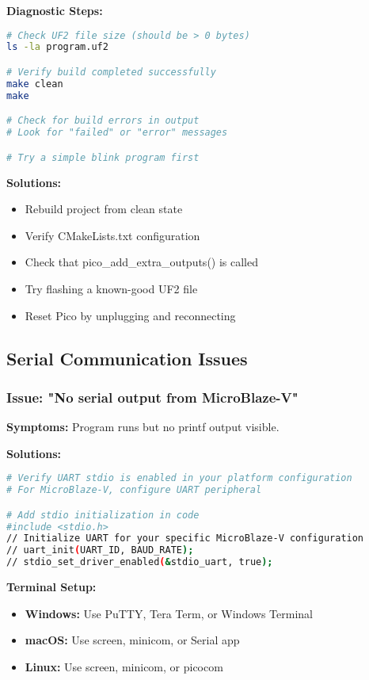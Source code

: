 \documentclass[11pt,a4paper]{article}
\begin{document}
\textbf{Diagnostic Steps:}
\begin{lstlisting}[language=bash]
# Check UF2 file size (should be > 0 bytes)
ls -la program.uf2

# Verify build completed successfully
make clean
make

# Check for build errors in output
# Look for "failed" or "error" messages

# Try a simple blink program first
\end{lstlisting}

\textbf{Solutions:}
\begin{itemize}
    \item Rebuild project from clean state
    \item Verify CMakeLists.txt configuration
    \item Check that pico\_add\_extra\_outputs() is called
    \item Try flashing a known-good UF2 file
    \item Reset Pico by unplugging and reconnecting
\end{itemize}

\subsection{Serial Communication Issues}

\subsubsection{Issue: "No serial output from MicroBlaze-V"}
\textbf{Symptoms:} Program runs but no printf output visible.

\textbf{Solutions:}
\begin{lstlisting}[language=bash]
# Verify UART stdio is enabled in your platform configuration
# For MicroBlaze-V, configure UART peripheral

# Add stdio initialization in code
#include <stdio.h>
// Initialize UART for your specific MicroBlaze-V configuration
// uart_init(UART_ID, BAUD_RATE);
// stdio_set_driver_enabled(&stdio_uart, true);
\end{lstlisting}

\textbf{Terminal Setup:}
\begin{itemize}
    \item \textbf{Windows:} Use PuTTY, Tera Term, or Windows Terminal
    \item \textbf{macOS:} Use screen, minicom, or Serial app
    \item \textbf{Linux:} Use screen, minicom, or picocom
\end{itemize}
\end{document}
